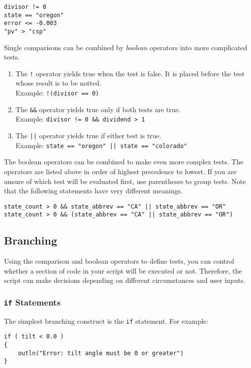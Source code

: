 \documentclass{article}
\begin{document}
\begin{verbatim}
divisor != 0
state == "oregon"
error <= -0.003
"pv" > "csp"
\end{verbatim}

Single comparisons can be combined by \emph{boolean} operators into more complicated tests.

\begin{enumerate}
\item The \texttt{!} operator yields true when the test is false.  It is placed before the test whose result is to be notted.\\Example: \texttt{!(divisor == 0)}
\item The \texttt{\&\&} operator yields true only if both tests are true.\\Example: \texttt{divisor != 0 \&\& dividend > 1}
\item The \texttt{||} operator yields true if either test is true.\\Example: \texttt{state == "oregon" || state == "colorado"}
\end{enumerate}

The boolean operators can be combined to make even more complex tests.  The operators are listed above in order of highest precedence to lowest.  If you are unsure of which test will be evaluated first, use parentheses to group tests.  Note that the following statements have very different meanings.

\begin{verbatim}
state_count > 0 && state_abbrev == "CA" || state_abbrev == "OR"
state_count > 0 && (state_abbrev == "CA" || state_abbrev == "OR")
\end{verbatim}

\subsection{Branching}
Using the comparison and boolean operators to define tests, you can control whether a section of code in your script will be executed or not.  Therefore, the script can make decisions depending on different circumstances and user inputs.

\subsubsection{\texttt{if} Statements}

The simplest branching construct is the \texttt{if} statement.  For example:

\begin{verbatim}
if ( tilt < 0.0 )
{
    outln("Error: tilt angle must be 0 or greater")
}
\end{verbatim}
\end{document}
